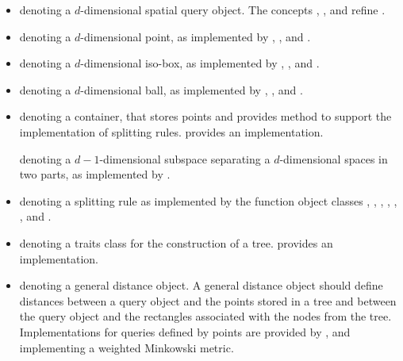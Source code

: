 \begin{itemize}

\item
{} denoting a $d$-dimensional spatial query object. The concepts
, , and  refine .

\item 
{} 
denoting a $d$-dimensional point, as implemented by 
, , and .

\item
{} 
denoting a $d$-dimensional iso-box, as implemented
by
, , 
and .

\item
{}
denoting a $d$-dimensional ball, as implemented by
, ,
and .


\item
{} denoting a container, that stores points and
provides method to support the implementation of splitting rules. 
 provides an implementation.


 denoting a $d-1$-dimensional
subspace separating a $d$-dimensional spaces in two parts,
as implemented by .

\item 
{} denoting a splitting rule as implemented by the function object classes 
,
,
,
,
,
, and
.

\item
{} denoting a traits class for the construction of a tree.
 provides an implementation. 

\item
{} denoting a general distance object. A general distance object should define distances between a query object
and the points stored in a tree and between the query object and the rectangles associated with the nodes from the tree.
Implementations for queries defined by points are provided
by , and
 implementing 
a weighted Minkowski metric.


\end{itemize}
